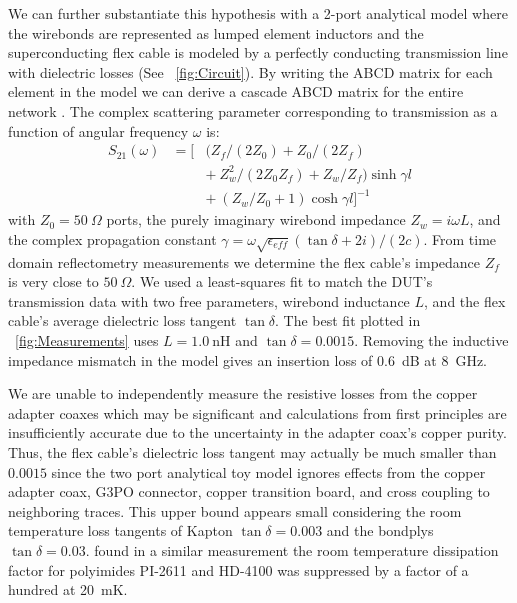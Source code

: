 We can further substantiate this hypothesis with a 2-port analytical model where the wirebonds are represented as lumped element inductors and the superconducting flex cable is modeled by a perfectly conducting transmission line with dielectric losses (See \figurename~\ref{fig:Circuit}). By writing the ABCD matrix for each element in the model we can derive a cascade ABCD matrix for the entire network \parencite{Pozar}. The complex scattering parameter corresponding to transmission as a function of angular frequency $\omega$ is:
\setlength{\arraycolsep}{0.0em}
\begin{eqnarray}
S_{21}(\omega)&{}={}[&(Z_{f}/(2 Z_{0}) + Z_{0}/(2 Z_{f}) \nonumber\\
&&{+}\: Z_{w}^2/(2 Z_{0} Z_{f}) + Z_{w}/Z_{f}) \sinh{\gamma l} \nonumber\\
&&{+}\:(Z_{w}/Z_{0} + 1) \cosh{\gamma l}]^{-1}
\end{eqnarray}
\setlength{\arraycolsep}{5pt}
with $Z_{0}=50~\Omega$ ports, the purely imaginary wirebond impedance $Z_{w}=i \omega L$, and the complex propagation constant $\gamma = \omega \sqrt{\epsilon_{eff}} (\tan{\delta} + 2 i)/(2 c)$. From time domain reflectometry measurements we determine the flex cable's impedance $Z_{f}$ is very close to $50~\Omega$. We used a least-squares fit to match the DUT's transmission data with two free parameters, wirebond inductance $L$, and the flex cable's average dielectric loss tangent $\tan{\delta}$. The best fit plotted in \figurename~\ref{fig:Measurements} uses $L=1.0~\textrm{nH}$ and $\tan{\delta} =0.0015$. Removing the inductive impedance mismatch in the model gives an insertion loss of 0.6~dB at 8~GHz. 

We are unable to independently measure the resistive losses from the copper adapter coaxes which may be significant and calculations from first principles are insufficiently accurate due to the uncertainty in the adapter coax's copper purity. Thus, the flex cable's dielectric loss tangent may actually be much smaller than $0.0015$ since the two port analytical toy model ignores effects from the copper adapter coax, G3PO connector, copper transition board, and cross coupling to neighboring traces. This upper bound appears small considering the room temperature loss tangents of Kapton $\tan{\delta}=0.003$ and the bondplys $\tan{\delta}=0.03$. \textcite{Tuckerman} found in a similar measurement the room temperature dissipation factor for polyimides PI-2611 and HD-4100 was suppressed by a factor of a hundred at 20~mK. 

